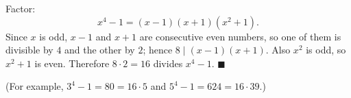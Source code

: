 Factor:
\[x^4-1=(x-1)(x+1)\left(x^2+1\right).\]
Since $x$ is odd, $x-1$ and $x+1$ are consecutive even numbers, so one of them is divisible by $4$ and the other by $2$; hence $8\mid(x-1)(x+1)$. Also $x^2$ is odd, so $x^2+1$ is even. Therefore $8\cdot2=16$ divides $x^4-1$. $\blacksquare$

(For example, $3^4-1=80=16\cdot5$ and $5^4-1=624=16\cdot39$.)
